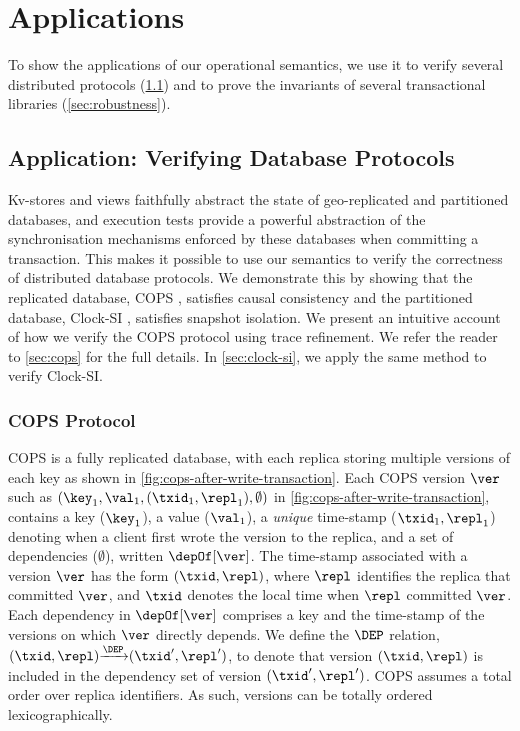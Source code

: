 \section{Applications}
\label{sec:applications}
\label{sec:program-analysis}

To show the applications of our operational semantics, 
we use it to verify several distributed protocols (\cref{sec:verify-impl}) and
to prove the invariants of several transactional libraries (\cref{sec:robustness}).

\subsection{Application: Verifying Database Protocols}
\label{sec:verify-impl}
Kv-stores and views faithfully abstract the state of geo-replicated and partitioned
databases, and execution tests provide a powerful abstraction of the synchronisation mechanisms 
enforced by these databases when committing a transaction. 
This makes it possible to use our 
semantics to verify the correctness of distributed database protocols. 
We demonstrate this by showing that the replicated database,
COPS \cite{cops}, satisfies causal consistency and
the partitioned database, Clock-SI \cite{clocksi}, satisfies snapshot isolation.
We present an intuitive account of how we verify the COPS protocol using trace refinement.
We refer the reader to \cref{sec:cops} for the full details.
In \cref{sec:clock-si}, we apply the same method to verify Clock-SI.



\subsubsection{COPS Protocol} 
COPS is a fully replicated database, with each replica storing multiple versions of each key as shown in \cref{fig:cops-after-write-transaction}. 
Each COPS version \( \ver \)
such as \( (\key_1,\val_1,(\txid_1,\repl_1), \emptyset) \) in \cref{fig:cops-after-write-transaction},
contains a key ($\key_1$), a value ($\val_1$), a \emph{unique} time-stamp ($\txid_1, \repl_1$) denoting
when a client first wrote the version to the replica, 
and a set of dependencies ($\emptyset$), written $\depOf[\ver]$. 
The time-stamp associated with a version $\ver$ has the form $(\txid, \repl)$, where $\repl$ identifies the replica that committed $\ver$, 
and $\txid$ denotes the local time when $\repl$ committed $\ver$. 
Each dependency in $\depOf[\ver]$ comprises a key and the time-stamp of the versions on which $\ver$ directly depends.  
We define the \( \DEP \) relation, \( (\txid,\repl) {\xrightarrow{\DEP}} (\txid',\repl') \),
to denote that version \( (\txid,\repl) \) is included in the dependency set of version \( (\txid',\repl')\).
COPS assumes a total order over replica identifiers. 
As such, versions can be totally ordered lexicographically. 

